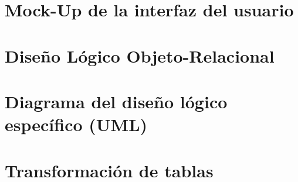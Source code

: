 \section{Mock-Up de la interfaz del usuario}

\newpage
\section{Diseño Lógico Objeto-Relacional}

\newpage
\section{Diagrama del diseño lógico específico (UML)}

\newpage
\section{Transformación de tablas}